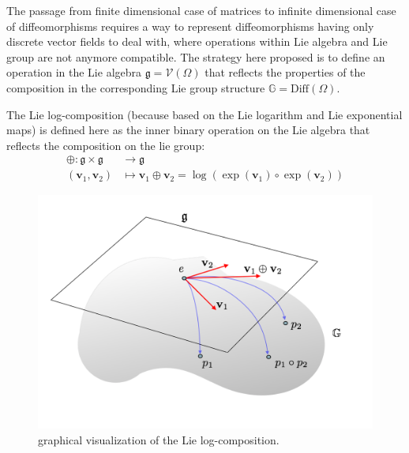 The passage from finite dimensional case of matrices to infinite dimensional case of diffeomorphisms requires a way to represent diffeomorphisms having only discrete vector fields to deal with, where operations within Lie algebra and Lie group are not anymore compatible. The strategy here proposed is to define an operation in the Lie algebra $\mathfrak{g} = \mathcal{V}(\Omega)$ that reflects the properties of the composition in the corresponding Lie group structure $\mathbb{G} = \text{Diff}(\Omega)$.

The Lie log-composition (because based on the Lie logarithm and Lie exponential maps) is defined here as the inner binary operation on the Lie algebra that reflects the composition on the lie group:
\begin{align}\label{eq:main_def_log_composition}
\oplus : \mathfrak{g} \times \mathfrak{g} & \longrightarrow \mathfrak{g}    \\
(\mathbf{v}_{1}, \mathbf{v}_{2}) &\longmapsto \mathbf{v}_{1}\oplus \mathbf{v}_{2} =  \log(\exp(\mathbf{v}_1)\circ \exp(\mathbf{v}_2))
\end{align}

\begin{figure}[!ht]
	\centering
	\includegraphics[scale=0.35]{figures/log_composition.png}
	\caption{graphical visualization of the Lie log-composition.}
	\label{fig:composition}
\end{figure}


